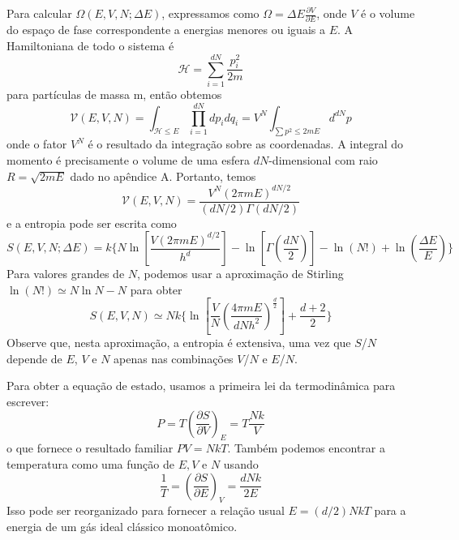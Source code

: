 \documentclass[12pt]{article}
\begin{document}
Para calcular $\Omega (E, V, N; \Delta E)$, expressamos como $\Omega = \Delta E \frac{\partial V}{\partial E}$, onde $V$ é o volume do espaço de fase correspondente a energias menores ou iguais a $E$. A Hamiltoniana de todo o sistema é
\[
\mathcal{H} = \sum_{i=1}^{dN} \frac{p_i^2}{2m}
\]
para partículas de massa m, então obtemos 
\[
\mathcal{V}(E, V, N) = \int_{\mathcal{H} \leq E} \prod_{i=1}^{dN} dp_i dq_i = V^N \int_{\sum p^2 \leq 2mE} d^{dN} p
\]
onde o fator $V^N $ é o resultado da integração sobre as coordenadas. A integral do momento é precisamente o volume de uma esfera $dN$-dimensional com raio $R = \sqrt{2mE}$  dado no apêndice A. Portanto, temos 
\[
\mathcal{V}(E, V, N) = \frac{V^N (2\pi m E)^{dN/2}}{(dN/2) \Gamma(dN/2)}
\]
e a entropia pode ser escrita como
 \[
 S(E, V, N; \Delta E) = k \Biggl\{ N \ln \left[ \frac{V (2 \pi m E)^{d/2}}{h^{d}} \right] - \ln \left[ \Gamma \left( \frac{dN}{2} \right) \right] - \ln(N!) + \ln \left( \frac{\Delta E}{E} \right) \Biggl\}
 \]
Para valores grandes de $N$, podemos usar a aproximação de Stirling $\ln(N!) \simeq N \ln N - N$ para obter \[
 S(E, V, N) \simeq Nk \biggl\{ \ln \left[ \frac{V }{N  } \left( \frac{ 4 \pi m E }{d N h^{2}}\right)^{\frac{d}{2}} \right] + \frac{d + 2}{2} \biggl\} 
 \]
 Observe que, nesta aproximação, a entropia é extensiva, uma vez que $S$/$N$ depende de $E$, $V$ e $N$ apenas nas combinações $V$/$N$ e $ E$/$N$.

Para obter a equação de estado, usamos a primeira lei da termodinâmica para escrever:
\[
P = T \left( \frac{\partial S}{\partial V} \right)_E = T \frac{Nk}{V}
\]
 o que fornece o resultado familiar $PV = NkT$. Também podemos encontrar a temperatura como uma função de $E, V$ e $N$ usando 
 \[
 \frac{1}{T} = \left( \frac{\partial S}{\partial E} \right)_V = \frac{dNk}{2E}
 \]
 Isso pode ser reorganizado para fornecer a relação usual $E = (d/2)NkT$ para a energia de um gás ideal clássico monoatômico. 
\end{document}
